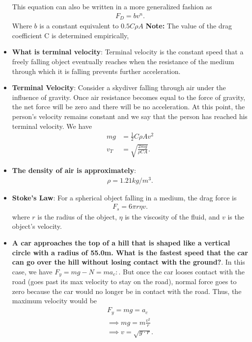\documentclass{report}
\begin{document}
\begin{itemize}
                     This equation can also be written in a more generalized fashion as
                     \begin{align*}
                         F_{D} = bv^{n}
                     .\end{align*}
                     Where $b$ is a constant equivalent to $0.5C\rho A$
                     \bigbreak \noindent 
                     \textbf{Note:} The value of the drag coefficient C is determined empirically,
                \item \textbf{What is terminal velocity}: Terminal velocity is the constant speed that a freely falling object eventually reaches when the resistance of the medium through which it is falling prevents further acceleration.
                \item \textbf{Terminal Velocity}: Consider a skydiver falling through air under the influence of gravity. Once air resistance becomes equal to the force of gravity, the net force will be zero and there will be no acceleration. At this point, the person’s velocity remains constant and we say that the person has reached his terminal velocity. We have
                    \begin{align*}
                        mg&=\frac{1}{2}C\rho Av^{2} \\
                        v_{T}&=\sqrt{\frac{2mg}{\rho CA}}
                    .\end{align*}
                \item \textbf{The density of air is approximately}:
                    \begin{align*}
                        \rho = 1.21 kg /m^{3}
                    .\end{align*}
                \item \textbf{Stoke's Law}: For a spherical object falling in a medium, the drag force is
                    \begin{align*}
                        F_{s} = 6\pi r\eta v
                    .\end{align*}
                where $r$ is the radius of the object, $\eta$ is the viscosity of the fluid, and $v$ is the object’s velocity.
        \item \textbf{A car approaches the top of a hill that is shaped like a vertical circle with a radius of 55.0m. What is the fastest speed that the car can go over the hill without losing contact with the ground?}. In this case, we have $F_{y} = mg-N = ma_{c}: $. But once the car looses contact with the road (goes past its max velocity to stay on the road), normal force goes to zero because the car would no longer be in contact with the road. Thus, the maximum velocity would be
            \begin{align*}
                F_{y} = mg = a_{c}  \\
                \implies mg = m\frac{v^{2}}{r} \\
                \implies v = \sqrt{g \cdot r}
            .\end{align*}

    \end{itemize}
\end{document}
